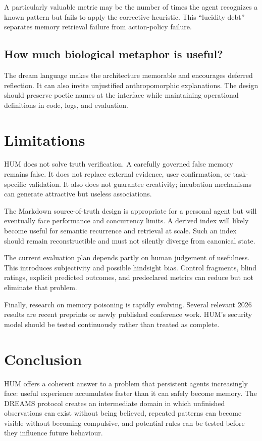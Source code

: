 \documentclass[11pt,a4paper]{article}
\begin{document}
A particularly valuable metric may be the number of times the agent recognizes a known pattern but fails to apply the corrective heuristic. This ``lucidity debt'' separates memory retrieval failure from action-policy failure.

\subsection{How much biological metaphor is useful?}

The dream language makes the architecture memorable and encourages deferred reflection. It can also invite unjustified anthropomorphic explanations. The design should preserve poetic names at the interface while maintaining operational definitions in code, logs, and evaluation.

\section{Limitations}

HUM does not solve truth verification. A carefully governed false memory remains false. It does not replace external evidence, user confirmation, or task-specific validation. It also does not guarantee creativity; incubation mechanisms can generate attractive but useless associations.

The Markdown source-of-truth design is appropriate for a personal agent but will eventually face performance and concurrency limits. A derived index will likely become useful for semantic recurrence and retrieval at scale. Such an index should remain reconstructible and must not silently diverge from canonical state.

The current evaluation plan depends partly on human judgement of usefulness. This introduces subjectivity and possible hindsight bias. Control fragments, blind ratings, explicit predicted outcomes, and predeclared metrics can reduce but not eliminate that problem.

Finally, research on memory poisoning is rapidly evolving. Several relevant 2026 results are recent preprints or newly published conference work. HUM's security model should be tested continuously rather than treated as complete.

\section{Conclusion}

HUM offers a coherent answer to a problem that persistent agents increasingly face: useful experience accumulates faster than it can safely become memory. The DREAMS protocol creates an intermediate domain in which unfinished observations can exist without being believed, repeated patterns can become visible without becoming compulsive, and potential rules can be tested before they influence future behaviour.
\end{document}
